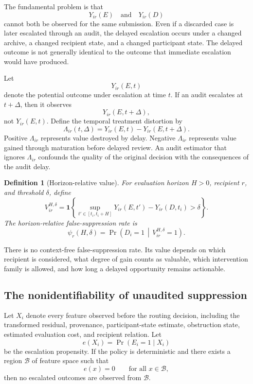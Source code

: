 \documentclass[11pt]{article}
\newtheorem{definition}{Definition}[section]
\theoremstyle{definition}
\DeclareMathOperator{\Prob}{Pr}
\newcommand{\given}{\,\middle|\,}
\newcommand{\ind}{\mathbf{1}}
\begin{document}
The fundamental problem is that
\[
Y_{ir}(E)
\quad\text{and}\quad
Y_{ir}(D)
\]
cannot both be observed for the same submission. Even if a discarded case is later escalated through an audit, the delayed escalation occurs under a changed archive, a changed recipient state, and a changed participant state. The delayed outcome is not generally identical to the outcome that immediate escalation would have produced.

Let
\[
Y_{ir}(E,t)
\]
denote the potential outcome under escalation at time \(t\). If an audit escalates at \(t+\Delta\), then it observes
\[
Y_{ir}(E,t+\Delta),
\]
not \(Y_{ir}(E,t)\). Define the temporal treatment distortion by
\[
\Lambda_{ir}(t,\Delta)
=
Y_{ir}(E,t)-Y_{ir}(E,t+\Delta).
\]
Positive \(\Lambda_{ir}\) represents value destroyed by delay. Negative \(\Lambda_{ir}\) represents value gained through maturation before delayed review. An audit estimator that ignores \(\Lambda_{ir}\) confounds the quality of the original decision with the consequences of the audit delay.

\begin{definition}[Horizon-relative value]
For evaluation horizon \(H>0\), recipient \(r\), and threshold \(\delta\), define
\[
V_{ir}^{H,\delta}
=
\ind\!\left\{
\sup_{t'\in[t_i,t_i+H]}
Y_{ir}(E,t')
-
Y_{ir}(D,t_i)
>
\delta
\right\}.
\]
The horizon-relative false-suppression rate is
\[
\psi_r(H,\delta)
=
\Prob\!\left(
D_i=1
\given
V_{ir}^{H,\delta}=1
\right).
\]
\end{definition}

There is no context-free false-suppression rate. Its value depends on which recipient is considered, what degree of gain counts as valuable, which intervention family is allowed, and how long a delayed opportunity remains actionable.

\subsection{The nonidentifiability of unaudited suppression}

Let \(X_i\) denote every feature observed before the routing decision, including the transformed residual, provenance, participant-state estimate, obstruction state, estimated evaluation cost, and recipient relation. Let
\[
e(X_i)
=
\Prob(E_i=1\mid X_i)
\]
be the escalation propensity. If the policy is deterministic and there exists a region \(\mathcal{B}\) of feature space such that
\[
e(x)=0
\qquad
\text{for all }x\in\mathcal{B},
\]
then no escalated outcomes are observed from \(\mathcal{B}\).
\end{document}
